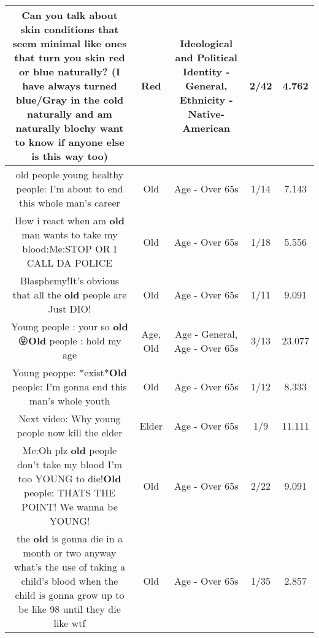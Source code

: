 \documentclass[11pt]{article}
\newlength\mylength
\begin{document}
\begin{center}
\begin{longtable}{|C{.65\mylength}|C{.30\mylength}|C{.12\mylength}|C{.12\mylength}|C{.12\mylength}|}
  \small Can you talk about skin conditions that seem minimal like ones that turn you skin \textbf{r\textbf{ed}} or blue naturally? (I have always turned blue/Gray in the cold naturally and am naturally blochy want to know if anyone else is this way too)\normalsize   & Red &  Ideological and Political Identity - General, Ethnicity - Native-American & 2/42 & 4.762 \\  \hline
  \small old people \@ young healthy people: I'm about to end this whole man's career\normalsize   & Old & Age - Over 65s & 1/14 & 7.143 \\  \hline
  \small How i react when am \textbf{old} man wants to take my blood:Me:STOP OR I CALL DA POLICE\normalsize   & Old & Age - Over 65s & 1/18 & 5.556 \\  \hline
  \small Blasphemy!It's obvious that all the \textbf{old} people are Just DIO!\normalsize   & Old & Age - Over 65s & 1/11 & 9.091 \\  \hline
  \small Young people : your so \textbf{old}  😝\textbf{Old} people : hold my age\normalsize   & Age, Old & Age - General, Age - Over 65s & 3/13 & 23.077 \\  \hline
  \small Young peoppe: *exist*\textbf{Old} people: I'm gonna end this man's whole youth\normalsize   & Old & Age - Over 65s & 1/12 & 8.333 \\  \hline
  \small Next video: Why young people now kill the elder\normalsize   & Elder & Age - Over 65s & 1/9 & 11.111 \\  \hline
  \small Me:Oh plz \textbf{old} people don't take my blood I'm too YOUNG to die!\textbf{Old} people: THATS THE POINT! We wanna be YOUNG!\normalsize   & Old & Age - Over 65s & 2/22 & 9.091 \\  \hline
  \small the \textbf{old} is gonna die in a month    or two anyway what's the use of taking a child's blood when the child is gonna grow up to be like 98 until they die like wtf\normalsize   & Old & Age - Over 65s & 1/35 & 2.857 \\  \hline

\end{longtable}
\end{center}
\end{document}
